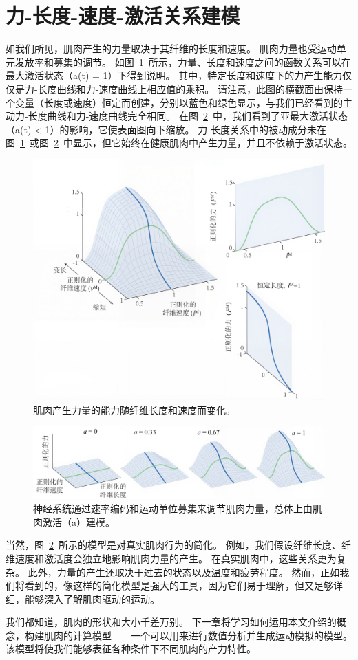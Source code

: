 \section{力-长度-速度-激活关系建模}

如我们所见，肌肉产生的力量取决于其纤维的长度和速度。
肌肉力量也受运动单元发放率和募集的调节。
如图~\ref{fig:4_17}~所示，力量、长度和速度之间的函数关系可以在最大激活状态（a(t) = 1）下得到说明。
其中，特定长度和速度下的力产生能力仅仅是力-长度曲线和力-速度曲线上相应值的乘积。
请注意，此图的横截面由保持一个变量（长度或速度）恒定而创建，分别以蓝色和绿色显示，与我们已经看到的主动力-长度曲线和力-速度曲线完全相同。
在图~\ref{fig:4_18}~中，我们看到了亚最大激活状态（a(t) < 1）的影响，它使表面图向下缩放。
力-长度关系中的被动成分未在图~\ref{fig:4_17}~或图~\ref{fig:4_18}~中显示，但它始终在健康肌肉中产生力量，并且不依赖于激活状态。

\begin{figure}[!htb]
	\centering
	\includegraphics[width=1.0\linewidth]{chap4/4_17}
	\caption{肌肉产生力量的能力随纤维长度和速度而变化\cite{lieber2002skeletal}。 \label{fig:4_17}}
\end{figure}


\begin{figure}[!htb]
	\centering
	\includegraphics[width=1.0\linewidth]{chap4/4_18}
	\caption{神经系统通过速率编码和运动单位募集来调节肌肉力量，总体上由肌肉激活（a）建模。 \label{fig:4_18}}
\end{figure}


当然，图~\ref{fig:4_18}~所示的模型是对真实肌肉行为的简化。
例如，我们假设纤维长度、纤维速度和激活度会独立地影响肌肉力量的产生。
在真实肌肉中，这些关系更为复杂。
此外，力量的产生还取决于过去的状态以及温度和疲劳程度。
然而，正如我们将看到的，像这样的简化模型是强大的工具，因为它们易于理解，但又足够详细，能够深入了解肌肉驱动的运动。


我们都知道，肌肉的形状和大小千差万别。
下一章将学习如何运用本文介绍的概念，构建肌肉的计算模型——一个可以用来进行数值分析并生成运动模拟的模型。
该模型将使我们能够表征各种条件下不同肌肉的产力特性。






